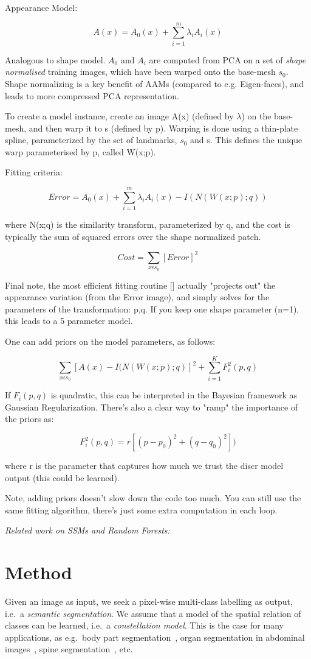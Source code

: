 \documentclass[10pt,twocolumn,letterpaper]{article}
\begin{document}
Appearance Model:

\[A(x) = A_0(x) + \sum_{i=1}^m \lambda_i A_i(x)\]

Analogous to shape model. $A_0$ and $A_i$ are computed from PCA on a set of \emph{shape normalised} training images, which have been warped onto the base-mesh $s_0$.  Shape normalizing is a key benefit of AAMs (compared to e.g. Eigen-faces), and leads to more compressed PCA representation.

To create a model instance, create an image A(x) (defined by $\lambda$) on the base-mesh, and then warp it to s (defined by p).  Warping is done using a thin-plate spline, parameterized by the set of landmarks, $s_0$ and s.  This defines the unique warp parameterised by p, called W(x;p).

Fitting criteria:

\[Error = A_0(x) + \sum_{i=1}^m \lambda_i A_i(x) - I(N(W(x;p);q)) \]

where N(x;q) is the similarity transform, parameterized by q, and the cost is typically the sum of squared errors over the shape normalized patch.

\[Cost = \sum_{x \epsilon s_0} [Error]^2 \]

Final note, the most efficient fitting routine [] actually "projects out" the appearance variation (from the Error image), and simply solves for the parameters of the transformation: p,q.  If you keep one shape parameter (n=1), this leads to a 5 parameter model.


One can add priors on the model parameters, as follows:

\[ \sum_{x \epsilon s_0} [A(x) - I(N(W(x;p);q)]^2 + \sum_{i=1}^K F_i^2(p,q) \]

If $F_i(p,q)$ is quadratic, this can be interpreted in the Bayesian framework as Gaussian Regularization.  There's also a clear way to "ramp" the importance of the priors as:

\[ F_i^2(p,q) = r[(p-p_0)^2+(q-q_0)^2]) \]

where r is the parameter that captures how much we trust the discr model output (this could be learned). 

Note, adding priors doesn't slow down the code too much.  You can still use the same fitting algorithm, there's just some extra computation in each loop.

\emph{Related work on SSMs and Random Forests: }



\section{Method}
Given an image as input, we seek a pixel-wise multi-class labelling as output, i.e.\ a \emph{semantic segmentation}. 
%
We assume that a model of the spatial relation of classes can be learned, i.e.\ a \emph{constellation model}. This is the case for many applications, as e.g.\ body part segmentation~\cite{PoseMachines2014}, organ segmentation in abdominal images~\cite{SeifertAnatomicalSPIE2009}, spine segmentation~\cite{Glocker2012,Glocker2013}, etc. 
%
\end{document}
